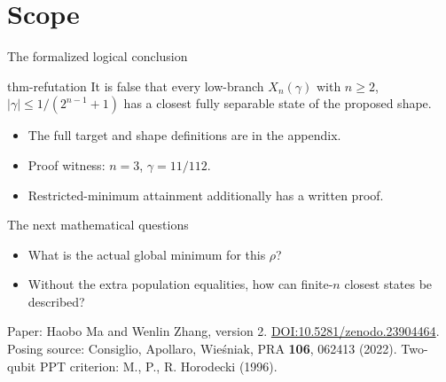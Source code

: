 \documentclass{beamer}
\begin{document}
\section{Scope}
\begin{frame}{The formalized logical conclusion}
\begin{bookresult}{thm-refutation}
It is false that every low-branch $X_n(\gamma)$ with $n\ge2$, $|\gamma|\le1/(2^{n-1}+1)$ has a closest fully separable state of the proposed shape.
\end{bookresult}
\begin{itemize}
\item The full target and shape definitions are in the appendix.
\item Proof witness: $n=3$, $\gamma=11/112$.
\item Restricted-minimum attainment additionally has a written proof.
\end{itemize}
\end{frame}
\begin{frame}{The next mathematical questions}
\begin{itemize}
\item What is the actual global minimum for this $\rho$?
\item Without the extra population equalities, how can finite-$n$ closest states be described?
\end{itemize}
\medskip
Paper: Haobo Ma and Wenlin Zhang, version 2.
\href{https://doi.org/10.5281/zenodo.23904464}{DOI:10.5281/zenodo.23904464}.
\medskip
Posing source: Consiglio, Apollaro, Wieśniak, PRA \textbf{106}, 062413 (2022).
\medskip
Two-qubit PPT criterion: M., P., R. Horodecki (1996).
\end{frame}
\appendix
\end{document}
